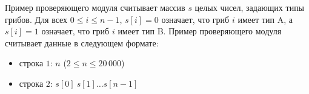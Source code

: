 Пример проверяющего модуля считывает массив $s$ целых чисел, задающих типы грибов. Для всех $0 \leq i \leq n-1$, $s[i] = 0$ означает, что гриб $i$ имеет тип A, а $s[i] = 1$ означает, что гриб $i$ имеет тип B.
Пример проверяющего модуля считывает данные в следующем формате:
\begin{itemize}
\item строка $1$: $n$ ($2 \leq n \leq 20\,000$)
\item строка $2$: $s[0]\ s[1] \ldots s[n-1]$
\end{itemize}